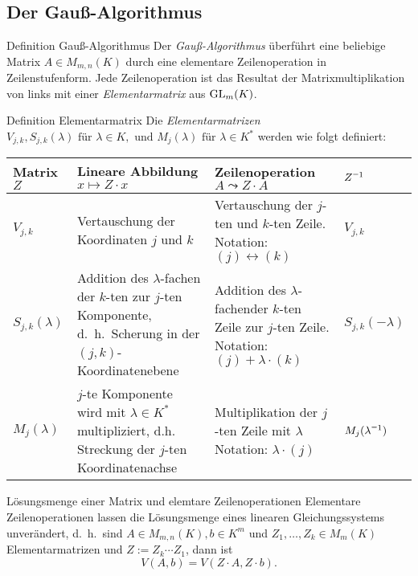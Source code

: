 \documentclass[main.tex]{subfiles}
\begin{document}
\subsection*{Der Gauß-Algorithmus}
\begin{karte}{Definition Gauß-Algorithmus}
    Der \textit{Gauß-Algorithmus} überführt eine beliebige Matrix 
    \( A \in M_{m,n}(K) \) durch eine elementare Zeilenoperation 
    in Zeilenstufenform. Jede Zeilenoperation ist das Resultat der 
    Matrixmultiplikation von links mit einer \textit{Elementarmatrix} 
    aus \( \operatorname{GL}_m(K) \).
\end{karte}
\begin{karte}{Definition Elementarmatrix}
    Die \textit{Elementarmatrizen} \(V_{j,k}, S_{j,k}(\lambda) 
    \text{ für } \lambda \in K, \text{ und } M_j(\lambda) \text{ für }
    \lambda \in K^* \) werden wie folgt definiert:\\
    \begin{tabular}{p{1 cm}|p{3 cm}|p{3 cm}|p{1 cm}}
        Matrix \(Z\) & Lineare Abbildung\newline \(x \mapsto Z \cdot x\) & Zeilenoperation\newline \(A\leadsto Z \cdot A\) & \(\inverse{Z}\) \\ 
        \hline
        \(V_{j,k}\) & Vertauschung der Koordinaten \(j\) und \(k\) & Vertauschung der \(j\)-ten und \(k\)-ten Zeile. \newline Notation: \( (j) \leftrightarrow (k) \) & \(V_{j,k}\) \\
        \hline
        \(S_{j,k}(\lambda)\) & Addition des \(\lambda\)-fachen \newline der \(k\)-ten zur \(j\)-ten \newline Komponente, d.\ h.\ \newline Scherung in der \((j,k)\)-Koordinatenebene & Addition des \(\lambda\)-fachen\newline der \(k\)-ten Zeile zur \(j\)-ten Zeile. \newline Notation: \((j) + \lambda \cdot (k) \) & \(S_{j,k}(-\lambda)\) \\
        \hline
        \(M_j(\lambda)\) & \(j\)-te Komponente wird mit \( \lambda \in K^* \) multipliziert, d.h. Streckung der \(j\)-ten Koordinatenachse & Multiplikation der \(j\)-ten Zeile mit \(\lambda\) \newline Notation: \(\lambda \cdot (j) \) & \(M_j(\inverse{\lambda})\)
    \end{tabular}
\end{karte}
\begin{karte}{Lösungsmenge einer Matrix und elemtare Zeilenoperationen}
    Elementare Zeilenoperationen lassen die Lösungsmenge eines 
    linearen Gleichungssystems unverändert, d.\ h.\ sind 
    \( A \in M_{m,n}(K), b \in K^m \) und \( Z_1,\ldots, Z_k \in M_m(K) \)
    Elementarmatrizen und \( Z := Z_k \cdots Z_1 \), dann ist 
    \[ V(A,b) = V(Z \cdot A, Z \cdot b). \]
\end{karte}
\end{document}
